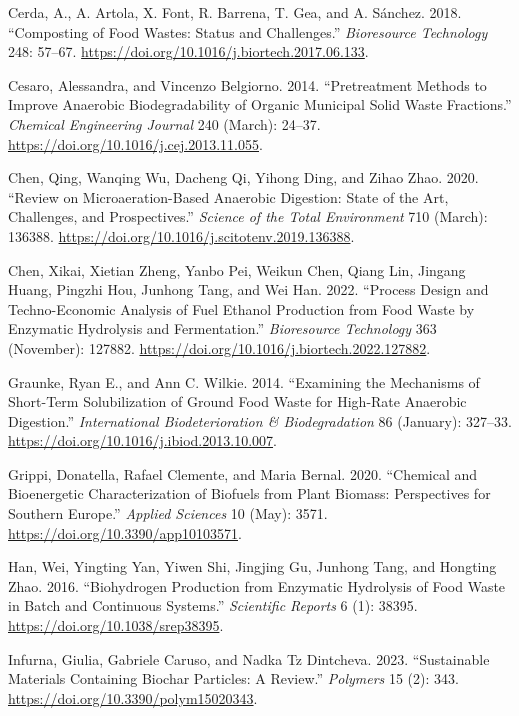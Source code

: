 \documentclass[11pt]{report}
\begin{document}
\begin{hangparas}{1.5em}{1}
\hypertarget{citeproc_bib_item_6}{Cerda, A., A. Artola, X. Font, R. Barrena, T. Gea, and A. Sánchez. 2018. “Composting of Food Wastes: Status and Challenges.” \textit{Bioresource Technology} 248: 57–67. \url{https://doi.org/10.1016/j.biortech.2017.06.133}.}

\hypertarget{citeproc_bib_item_7}{Cesaro, Alessandra, and Vincenzo Belgiorno. 2014. “Pretreatment Methods to Improve Anaerobic Biodegradability of Organic Municipal Solid Waste Fractions.” \textit{Chemical Engineering Journal} 240 (March): 24–37. \url{https://doi.org/10.1016/j.cej.2013.11.055}.}

\hypertarget{citeproc_bib_item_8}{Chen, Qing, Wanqing Wu, Dacheng Qi, Yihong Ding, and Zihao Zhao. 2020. “Review on Microaeration-Based Anaerobic Digestion: State of the Art, Challenges, and Prospectives.” \textit{Science of the Total Environment} 710 (March): 136388. \url{https://doi.org/10.1016/j.scitotenv.2019.136388}.}

\hypertarget{citeproc_bib_item_9}{Chen, Xikai, Xietian Zheng, Yanbo Pei, Weikun Chen, Qiang Lin, Jingang Huang, Pingzhi Hou, Junhong Tang, and Wei Han. 2022. “Process Design and Techno-Economic Analysis of Fuel Ethanol Production from Food Waste by Enzymatic Hydrolysis and Fermentation.” \textit{Bioresource Technology} 363 (November): 127882. \url{https://doi.org/10.1016/j.biortech.2022.127882}.}

\hypertarget{citeproc_bib_item_10}{Graunke, Ryan E., and Ann C. Wilkie. 2014. “Examining the Mechanisms of Short-Term Solubilization of Ground Food Waste for High-Rate Anaerobic Digestion.” \textit{International Biodeterioration \& Biodegradation} 86 (January): 327–33. \url{https://doi.org/10.1016/j.ibiod.2013.10.007}.}

\hypertarget{citeproc_bib_item_11}{Grippi, Donatella, Rafael Clemente, and Maria Bernal. 2020. “Chemical and Bioenergetic Characterization of Biofuels from Plant Biomass: Perspectives for Southern Europe.” \textit{Applied Sciences} 10 (May): 3571. \url{https://doi.org/10.3390/app10103571}.}

\hypertarget{citeproc_bib_item_12}{Han, Wei, Yingting Yan, Yiwen Shi, Jingjing Gu, Junhong Tang, and Hongting Zhao. 2016. “Biohydrogen Production from Enzymatic Hydrolysis of Food Waste in Batch and Continuous Systems.” \textit{Scientific Reports} 6 (1): 38395. \url{https://doi.org/10.1038/srep38395}.}

\hypertarget{citeproc_bib_item_13}{Infurna, Giulia, Gabriele Caruso, and Nadka Tz Dintcheva. 2023. “Sustainable Materials Containing Biochar Particles: A Review.” \textit{Polymers} 15 (2): 343. \url{https://doi.org/10.3390/polym15020343}.}


\end{hangparas}
\end{document}
